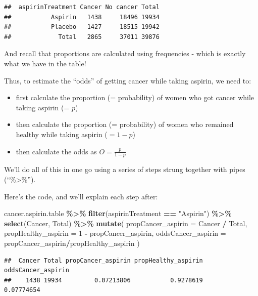 \documentclass[
]{book}
\newenvironment{Shaded}{\begin{snugshade}}{\end{snugshade}}
\newcommand{\AttributeTok}[1]{\textcolor[rgb]{0.13,0.29,0.53}{#1}}
\newcommand{\DecValTok}[1]{\textcolor[rgb]{0.00,0.00,0.81}{#1}}
\newcommand{\FunctionTok}[1]{\textcolor[rgb]{0.13,0.29,0.53}{\textbf{#1}}}
\newcommand{\NormalTok}[1]{#1}
\newcommand{\SpecialCharTok}[1]{\textcolor[rgb]{0.81,0.36,0.00}{\textbf{#1}}}
\newcommand{\StringTok}[1]{\textcolor[rgb]{0.31,0.60,0.02}{#1}}
\providecommand{\tightlist}{%
  \setlength{\itemsep}{0pt}\setlength{\parskip}{0pt}}
\begin{document}
\begin{verbatim}
##  aspirinTreatment Cancer No cancer Total
##           Aspirin   1438     18496 19934
##           Placebo   1427     18515 19942
##             Total   2865     37011 39876
\end{verbatim}

And recall that proportions are calculated using frequencies - which is exactly what we have in the table!

Thus, to estimate the ``odds'' of getting cancer while taking aspirin, we need to:

\begin{itemize}
\tightlist
\item
  first calculate the proportion (= probability) of women who got cancer while taking aspirin (= \({p}\))
\item
  then calculate the proportion (= probability) of women who remained healthy while taking aspirin (\(= 1-{p}\))
\item
  then calculate the odds as \(O = \frac{p}{1-p}\)
\end{itemize}

We'll do all of this in one go using a series of steps strung together with pipes (``\%\textgreater\%'').

Here's the code, and we'll explain each step after:

\begin{Shaded}
\begin{Highlighting}[]
\NormalTok{cancer.aspirin.table }\SpecialCharTok{\%\textgreater{}\%}
    \FunctionTok{filter}\NormalTok{(aspirinTreatment }\SpecialCharTok{==} \StringTok{"Aspirin"}\NormalTok{) }\SpecialCharTok{\%\textgreater{}\%}
    \FunctionTok{select}\NormalTok{(Cancer, Total) }\SpecialCharTok{\%\textgreater{}\%}
    \FunctionTok{mutate}\NormalTok{(}
       \AttributeTok{propCancer\_aspirin =}\NormalTok{ Cancer }\SpecialCharTok{/}\NormalTok{ Total,}
       \AttributeTok{propHealthy\_aspirin =} \DecValTok{1} \SpecialCharTok{{-}}\NormalTok{ propCancer\_aspirin,}
       \AttributeTok{oddsCancer\_aspirin =}\NormalTok{ propCancer\_aspirin}\SpecialCharTok{/}\NormalTok{propHealthy\_aspirin}
\NormalTok{    ) }
\end{Highlighting}
\end{Shaded}

\begin{verbatim}
##  Cancer Total propCancer_aspirin propHealthy_aspirin oddsCancer_aspirin
##    1438 19934         0.07213806           0.9278619         0.07774654
\end{verbatim}
\end{document}
